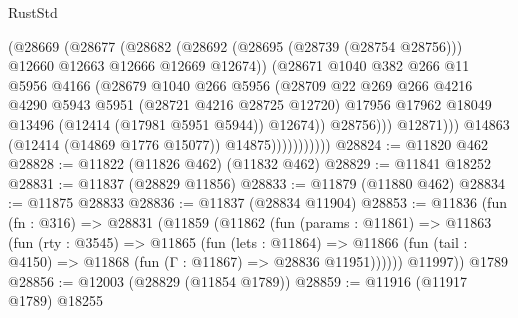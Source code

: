 \begin{lexlean}{RustStd}
\begin{coremodule}
{\begin{coremodule}
{{{{{{{{{{{{{{{{{{{{{{{{{{{{{{{{{{{{{{{{{{{{{{{{{{                                (@28669
                                  (@28677
                                    (@28682
                                      (@28692
                                        (@28695 (@28739 (@28754 @28756)))
                                        @12660
                                        @12663
                                        @12666
                                        @12669
                                        @12674))
                                    (@28671
                                      @1040
                                      @382
                                      @266
                                      @11
                                      @5956
                                      @4166
                                      (@28679
                                        @1040
                                        @266
                                        @5956
                                        (@28709
                                          @22
                                          @269
                                          @266
                                          @4216
                                          @4290
                                          @5943
                                          @5951
                                          (@28721 @4216 @28725 @12720)
                                          @17956
                                          @17962
                                          @18049
                                          @13496
                                          (@12414 (@17981 @5951 @5944))
                                          @12674))
                                      @28756)))
                                @12871)))
                          @14863
                          (@12414 (@14869 @1776 @15077))
                          @14875)))))))))))
@28824 := @11820 @462
@28828 := @11822 (@11826 @462) (@11832 @462)
@28829 := @11841 @18252
@28831 := @11837 (@28829 @11856)
@28833 := @11879 (@11880 @462)
@28834 := @11875 @28833
@28836 := @11837 (@28834 @11904)
@28853 := @11836
    (fun (fn : @316) =>
    @28831
      (@11859
        (@11862
          (fun (params : @11861) =>
          @11863
            (fun (rty : @3545) =>
            @11865
              (fun (lets : @11864) =>
              @11866 (fun (tail : @4150) => @11868 (fun (Γ : @11867) => @28836 @11951))))))
        @11997))
    @1789
@28856 := @12003 (@28829 (@11854 @1789))
@28859 := @11916 (@11917 @1789) @18255
}}}}}}}}}}}}}}}}}}}}}}}}}}}}}}}}}}}}}}}}}}}}}}}}}}
\end{coremodule}}
\end{coremodule}
\end{lexlean}
